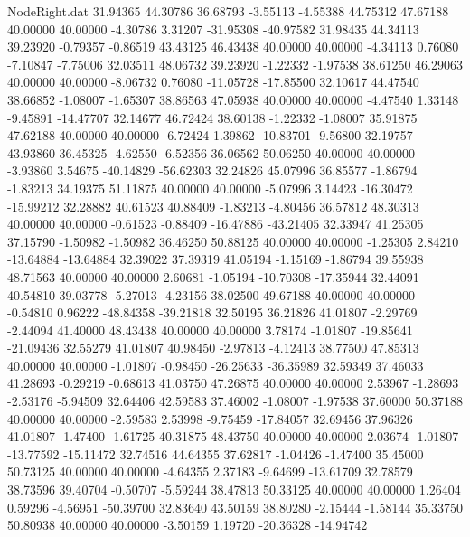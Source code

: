 \begin{filecontents}{NodeRight.dat}
  31.94365   44.30786   36.68793    -3.55113   -4.55388   44.75312   47.67188   40.00000   40.00000   -4.30786    3.31207  -31.95308  -40.97582
  31.98435   44.34113   39.23920    -0.79357   -0.86519   43.43125   46.43438   40.00000   40.00000   -4.34113    0.76080   -7.10847   -7.75006
  32.03511   48.06732   39.23920    -1.22332   -1.97538   38.61250   46.29063   40.00000   40.00000   -8.06732    0.76080  -11.05728  -17.85500
  32.10617   44.47540   38.66852    -1.08007   -1.65307   38.86563   47.05938   40.00000   40.00000   -4.47540    1.33148   -9.45891  -14.47707
  32.14677   46.72424   38.60138    -1.22332   -1.08007   35.91875   47.62188   40.00000   40.00000   -6.72424    1.39862  -10.83701   -9.56800
  32.19757   43.93860   36.45325    -4.62550   -6.52356   36.06562   50.06250   40.00000   40.00000   -3.93860    3.54675  -40.14829  -56.62303
  32.24826   45.07996   36.85577    -1.86794   -1.83213   34.19375   51.11875   40.00000   40.00000   -5.07996    3.14423  -16.30472  -15.99212
  32.28882   40.61523   40.88409    -1.83213   -4.80456   36.57812   48.30313   40.00000   40.00000   -0.61523   -0.88409  -16.47886  -43.21405
  32.33947   41.25305   37.15790    -1.50982   -1.50982   36.46250   50.88125   40.00000   40.00000   -1.25305    2.84210  -13.64884  -13.64884
  32.39022   37.39319   41.05194    -1.15169   -1.86794   39.55938   48.71563   40.00000   40.00000    2.60681   -1.05194  -10.70308  -17.35944
  32.44091   40.54810   39.03778    -5.27013   -4.23156   38.02500   49.67188   40.00000   40.00000   -0.54810    0.96222  -48.84358  -39.21818
  32.50195   36.21826   41.01807    -2.29769   -2.44094   41.40000   48.43438   40.00000   40.00000    3.78174   -1.01807  -19.85641  -21.09436
  32.55279   41.01807   40.98450    -2.97813   -4.12413   38.77500   47.85313   40.00000   40.00000   -1.01807   -0.98450  -26.25633  -36.35989
  32.59349   37.46033   41.28693    -0.29219   -0.68613   41.03750   47.26875   40.00000   40.00000    2.53967   -1.28693   -2.53176   -5.94509
  32.64406   42.59583   37.46002    -1.08007   -1.97538   37.60000   50.37188   40.00000   40.00000   -2.59583    2.53998   -9.75459  -17.84057
  32.69456   37.96326   41.01807    -1.47400   -1.61725   40.31875   48.43750   40.00000   40.00000    2.03674   -1.01807  -13.77592  -15.11472
  32.74516   44.64355   37.62817    -1.04426   -1.47400   35.45000   50.73125   40.00000   40.00000   -4.64355    2.37183   -9.64699  -13.61709
  32.78579   38.73596   39.40704    -0.50707   -5.59244   38.47813   50.33125   40.00000   40.00000    1.26404    0.59296   -4.56951  -50.39700
  32.83640   43.50159   38.80280    -2.15444   -1.58144   35.33750   50.80938   40.00000   40.00000   -3.50159    1.19720  -20.36328  -14.94742

\end{filecontents}
